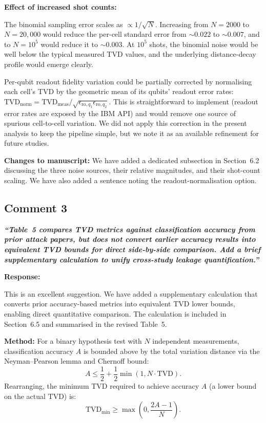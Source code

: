 \documentclass[11pt,a4paper]{article}
\begin{document}
\medskip\noindent\textbf{Effect of increased shot counts:}

The binomial sampling error scales as $\propto 1/\sqrt{N}$. Increasing from $N = 2000$ to
$N = 20{,}000$ would reduce the per-cell standard error from $\sim 0.022$ to $\sim 0.007$,
and to $N = 10^5$ would reduce it to $\sim 0.003$. At $10^5$ shots, the binomial noise
would be well below the typical measured TVD values, and the underlying distance-decay
profile would emerge clearly.

Per-qubit readout fidelity variation could be partially corrected by normalising each
cell's TVD by the geometric mean of its qubits' readout error rates:
$\mathrm{TVD}_{\mathrm{norm}} = \mathrm{TVD}_{\mathrm{meas}} /
\sqrt{\epsilon_{\mathrm{ro},q_1} \epsilon_{\mathrm{ro},q_2}}$.
This is straightforward to implement (readout error rates are exposed by the IBM API) and
would remove one source of spurious cell-to-cell variation. We did not apply this
correction in the present analysis to keep the pipeline simple, but we note it as an
available refinement for future studies.

\medskip\noindent\textbf{Changes to manuscript:} We have added a dedicated subsection in
Section~6.2 discussing the three noise sources, their relative magnitudes, and their
shot-count scaling. We have also added a sentence noting the readout-normalisation option.

\subsection*{Comment 3}

\noindent\textbf{\textit{``Table~5 compares TVD metrics against classification accuracy
from prior attack papers, but does not convert earlier accuracy results into equivalent TVD
bounds for direct side-by-side comparison. Add a brief supplementary calculation to unify
cross-study leakage quantification.''}}

\medskip\noindent\textbf{Response:}

This is an excellent suggestion. We have added a supplementary calculation that converts
prior accuracy-based metrics into equivalent TVD lower bounds, enabling direct quantitative
comparison. The calculation is included in Section~6.5 and summarised in the revised
Table~5.

\medskip\noindent\textbf{Method:} For a binary hypothesis test with $N$ independent
measurements, classification accuracy $A$ is bounded above by the total variation distance
via the Neyman--Pearson lemma and Chernoff bound:
%
\begin{equation}
    A \leq \frac{1}{2} + \frac{1}{2} \min(1, N \cdot \mathrm{TVD}).
    \label{eq:accuracy_bound}
\end{equation}
%
Rearranging, the minimum TVD required to achieve accuracy $A$ (a lower bound on the actual
TVD) is:
%
\begin{equation}
    \mathrm{TVD}_{\mathrm{min}} \geq \max\left(0, \frac{2A - 1}{N}\right).
    \label{eq:tvd_lower_bound}
\end{equation}
\end{document}
